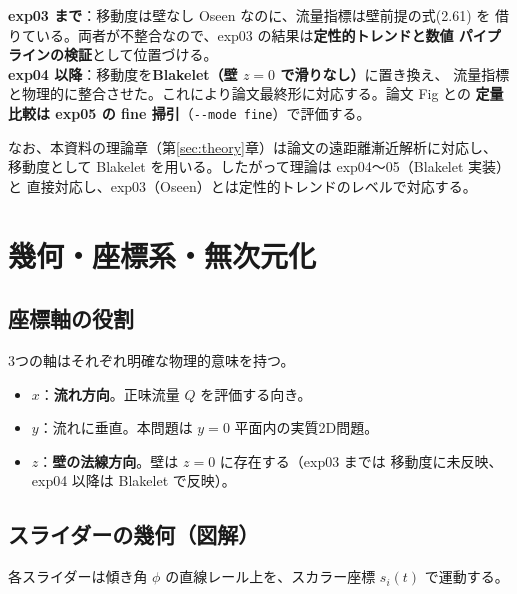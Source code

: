 \documentclass[11pt,a4paper]{article}
\begin{document}
\begin{keybox}
\textbf{exp03 まで}：移動度は壁なし Oseen なのに、流量指標は壁前提の式(2.61) を
借りている。両者が不整合なので、exp03 の結果は\textbf{定性的トレンドと数値
パイプラインの検証}として位置づける。\\[4pt]
\textbf{exp04 以降}：移動度を\textbf{Blakelet（壁 $z=0$ で滑りなし）}に置き換え、
流量指標と物理的に整合させた。これにより論文最終形に対応する。論文 Fig との
\textbf{定量比較は exp05 の fine 掃引}（\texttt{-{}-mode fine}）で評価する。
\end{keybox}

なお、本資料の理論章（第\ref{sec:theory}章）は論文の遠距離漸近解析に対応し、
移動度として Blakelet を用いる。したがって理論は exp04〜05（Blakelet 実装）と
直接対応し、exp03（Oseen）とは定性的トレンドのレベルで対応する。

\section{幾何・座標系・無次元化}

\subsection{座標軸の役割}

3つの軸はそれぞれ明確な物理的意味を持つ。

\begin{itemize}
\item $x$：\textbf{流れ方向}。正味流量 $Q$ を評価する向き。
\item $y$：流れに垂直。本問題は $y=0$ 平面内の実質2D問題。
\item $z$：\textbf{壁の法線方向}。壁は $z=0$ に存在する（exp03 までは
移動度に未反映、exp04 以降は Blakelet で反映）。
\end{itemize}

\subsection{スライダーの幾何（図解）}

各スライダーは傾き角 $\phi$ の直線レール上を、スカラー座標 $s_i(t)$ で運動する。
\end{document}
